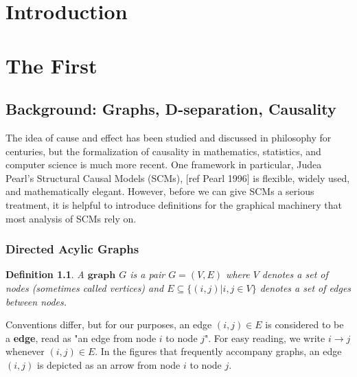 \documentclass[12pt,twoside]{reedthesis}
\newtheorem{definition}{Definition}[section]
\theoremstyle{definition}
\begin{document}
    \chapter*{Introduction}
         

	
	
    \chapter{The First}

\section{Background: Graphs, D-separation, Causality}
The idea of cause and effect has been studied and discussed in philosophy for centuries, but  the formalization of causality in mathematics, statistics, and computer science is much more recent. One framework in particular, Judea Pearl's Structural Causal Models (SCMs),  [ref Pearl 1996] is flexible, widely used, and mathematically elegant. However, before we can give SCMs a serious treatment, it is helpful to introduce definitions for the graphical machinery that most analysis of SCMs rely on.

\subsection{Directed Acylic Graphs}
\theoremstyle{definition}
\begin{definition}
A $\mathbf{graph}$ $G$ is a pair $G = (V, E)$ where $V$ denotes a set of nodes (sometimes called vertices) and $E \subseteq \{(i,j) | i,j \in V\}$ denotes a set of edges between nodes.
\end{definition}
Conventions differ, but for our purposes, an edge $(i,j) \in E$ is considered to be a \textbf{edge},  read as "an edge from node $i$ to node $j$".  For easy reading, we write $i \rightarrow j$ whenever $(i,j) \in E$. In the figures that frequently accompany graphs, an edge $(i,j)$ is depicted as an arrow from node $i$ to node $j$.
\end{document}
